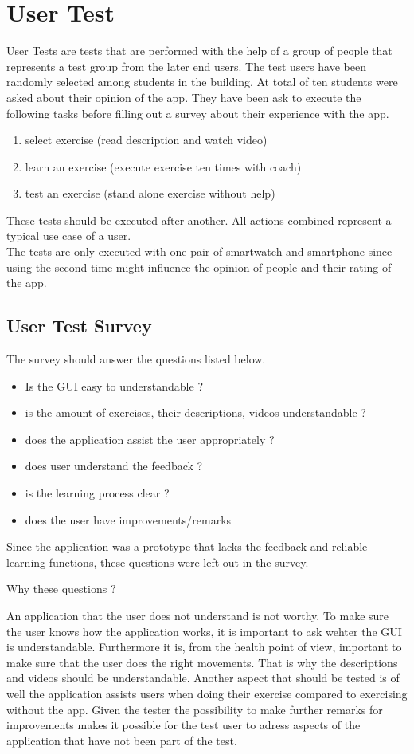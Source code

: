 \section{User Test}
User Tests are tests that are performed with the help of a group of people that represents a test group from the later end users. The test users have been randomly selected among students in the building. At total of ten students were asked about their opinion of the app. They have been ask to execute the following tasks before filling out a survey about their experience with the app.
\begin{enumerate}
\item select exercise (read description and watch video)
\item learn an exercise (execute exercise ten times with coach)
\item test an exercise (stand alone exercise without help)
\end{enumerate}

These tests should be executed after another. All actions combined represent a typical use case of a user.\\
The tests are only executed with one pair of smartwatch and smartphone since using the second time might influence the opinion of people and their rating of the app.

\subsection{User Test Survey}
The survey should answer the questions listed below.
\begin{itemize}
\item Is the GUI easy to understandable ?
\item is the amount of exercises, their descriptions, videos understandable ?
\item does the application assist the user appropriately ?
\item does user understand the feedback ?
\item is the learning process clear ?
\item does the user have improvements/remarks
\end{itemize}
Since the application was a prototype that lacks the feedback and reliable learning functions, these questions were left out in the survey.\\
\begin{Large}
Why these questions ?\\
\end{Large}
An application that the user does not understand is not worthy. To make sure the user knows how the application works, it is important to ask wehter the GUI is understandable.
Furthermore it is, from the health point of view, important to make sure that the user does the right movements. That is why the descriptions and videos should be understandable. Another aspect that should be tested is of well the application assists users when doing their exercise compared to exercising without the app.
Given the tester the possibility to make further remarks for improvements makes it possible for the test user to adress aspects of the application that have not been part of the test.

